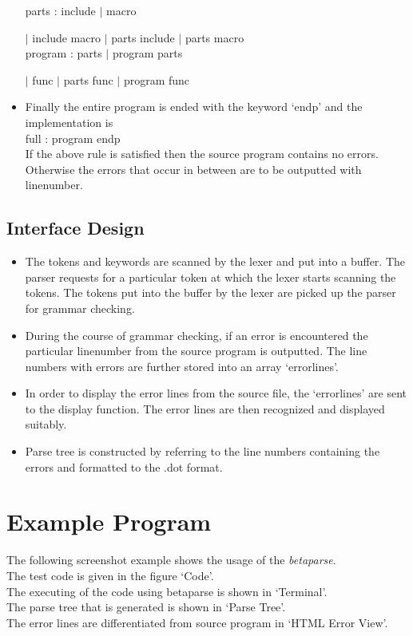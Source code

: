 \documentclass[12pt, oneside, a4paper]{article}
\begin{document}
\begin{itemize}
parts : include $|$ macro

\hspace{.5in}$|$ include macro $|$ parts include $|$ parts macro\\

program : parts $|$ program parts

\hspace{.5in}$|$ func $|$ parts func $|$ program func\\

\item Finally the entire program is ended with the keyword `endp' and the implementation is\\
full : program endp\\
If the above rule is satisfied then the source program contains no errors.  Otherwise the errors that occur in between are to be outputted with linenumber.
\end{itemize}

\subsection{Interface Design}
\begin{itemize}
\item The tokens and keywords are scanned by the lexer and put into a buffer.  The parser requests for a particular token at which the lexer starts scanning the tokens.  The tokens put into the buffer by the lexer are picked up the parser for grammar checking.

\item During the course of grammar checking, if an error is encountered the particular linenumber from the source program is outputted.
The line numbers with errors are further stored into an array `errorlines'.

\item In order to display the error lines from the source file, the `errorlines' are sent to the display function.  The error lines are then recognized and displayed suitably.

\item Parse tree is constructed by referring to the line numbers containing the errors and formatted to the .dot format.
\end{itemize}


\section{Example Program}
The following screenshot example shows the usage of the \emph{betaparse}.\\
The test code is given in the figure `Code'.\\
The executing of the code using betaparse is shown in `Terminal'.\\
The parse tree that is generated is shown in `Parse Tree'.\\
The error lines are differentiated from source program in `HTML Error View'.
\end{document}
